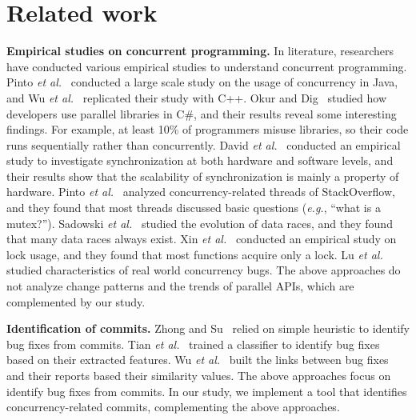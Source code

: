 \section{Related work}
\label{sec:related}
\noindent
\textbf{Empirical studies on concurrent programming.} In literature, researchers have conducted various empirical studies to understand concurrent programming. Pinto \emph{et al.}~\cite{journals/jss/PintoTFFB15} conducted a large scale study on the usage of concurrency in Java, and Wu \emph{et al.}~\cite{journals/infsof/WuCZX16} replicated their study with C++. Okur and Dig~\cite{conf/sigsoft/OkurD12} studied how developers use parallel libraries in C\#, and their results reveal some interesting findings. For example, at least 10\% of programmers misuse libraries, so their code runs sequentially rather than concurrently. David \emph{et al.}~\cite{conf/sosp/DavidGT13} conducted an empirical study to investigate synchronization at both hardware and software levels, and their results show that the scalability of synchronization is mainly a property of hardware. Pinto \emph{et al.}~\cite{conf/oopsla/PintoTC15} analyzed concurrency-related threads of StackOverflow, and they found that most threads discussed basic questions (\emph{e.g.}, ``what is a mutex?''). Sadowski \emph{et al.}~\cite{conf/msr/SadowskiYK12} studied the evolution of data races, and they found that many data races always exist. Xin \emph{et al.}~\cite{conf/icsm/XinQHXZWG13} conducted an empirical study on lock usage, and they found that most functions acquire only a lock. Lu \emph{et al.}~\cite{conf/asplos/LuPSZ08} studied characteristics of real world concurrency bugs. The above approaches do not analyze change patterns and the trends of parallel APIs, which are complemented by our study.


\noindent
\textbf{Identification of commits.} Zhong and Su~\cite{zhong2015bugfix} relied on simple heuristic to identify bug fixes from commits. Tian \emph{et al.}~\cite{tian2012identifying} trained a classifier to identify bug fixes based on their extracted features. Wu \emph{et al.}~\cite{wu2011relink} built the links between bug fixes and their reports based their similarity values. The above approaches focus on identify bug fixes from commits. In our study, we implement a tool that identifies concurrency-related commits, complementing the above approaches.
